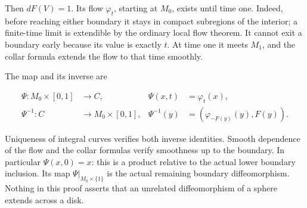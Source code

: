 Then \(dF(V)=1\). Its flow \(\varphi_t\), starting at \(M_0\), exists until time one. Indeed, before reaching either boundary it stays in compact subregions of the interior; a finite-time limit is extendible by the ordinary local flow theorem. It cannot exit a boundary early because its value is exactly \(t\). At time one it meets \(M_1\), and the collar formula extends the flow to that time smoothly.

The map and its inverse are

\begin{equation}
\begin{aligned}
\Psi:M_0\times[0,1]&\longrightarrow C,
&\Psi(x,t)&=\varphi_t(x),\\
\Psi^{-1}:C&\longrightarrow M_0\times[0,1],
&\Psi^{-1}(y)&=(\varphi_{-F(y)}(y),F(y)).
\end{aligned}
\label{courseIII:morse-cancellation-with-controlled-support:eq:6.2}
\end{equation}

Uniqueness of integral curves verifies both inverse identities. Smooth dependence of the flow and the collar formulas verify smoothness up to the boundary. In particular \(\Psi(x,0)=x\): this is a product relative to the actual lower boundary inclusion. Its map \(\Psi|_{M_0\times\{1\}}\) is the actual remaining boundary diffeomorphism. Nothing in this proof asserts that an unrelated diffeomorphism of a sphere extends across a disk.

